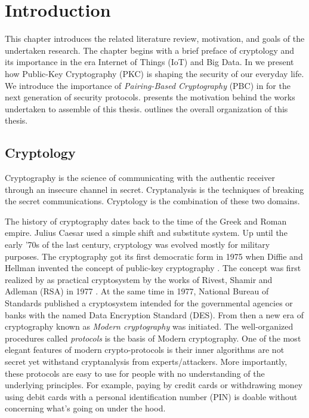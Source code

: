 \chapter{Introduction}
\label{chap:Introduction}
This chapter introduces the related literature review, motivation, and goals of the undertaken research.
The chapter begins with a brief preface of cryptology and its importance in the era Internet of Things (IoT) and Big Data.
In  we present how Public-Key Cryptography (PKC) is shaping the security of our everyday life.
We introduce the importance of \textit{Pairing-Based Cryptography} (PBC) in  for the next generation of security protocols. 
 presents the motivation behind the works undertaken to assemble of this thesis.
 outlines the overall organization of this thesis.

\section{Cryptology }
\label{chap:sec:crypto}
Cryptography is the science of communicating with the authentic receiver through an insecure channel in secret. 
Cryptanalysis is the techniques of breaking the secret communications.
Cryptology is the combination of these two domains.

The history of cryptography dates back to the time of the Greek and Roman empire.
Julius Caesar used a simple shift and substitute system.
Up until the early '70s of the last century, cryptology was evolved mostly for military purposes. 
The cryptography got its first democratic form in 1975 when Diffie and Hellman invented the concept of public-key cryptography \cite{diffie1976new}. 
The concept was first realized by as practical cryptosystem by the works of Rivest, Shamir and Adleman (RSA) in 1977 \cite{rivest1978method}. 
At the same time in 1977, National Bureau of Standards published a cryptosystem intended for the governmental agencies or banks with the named Data Encryption Standard (DES).
From then a new era of cryptography known as \textit{Modern cryptography} was initiated.
The well-organized procedures called \textit{protocols} is the basis of Modern cryptography.
One of the most elegant features of modern crypto-protocols is their inner algorithms are not secret yet withstand cryptanalysis from experts/attackers.
More importantly, these protocols are easy to use for people with no understanding of the underlying principles.
For example, paying by credit cards or withdrawing money using debit cards with a personal identification number (PIN) is doable without concerning what’s going on under the hood. 

